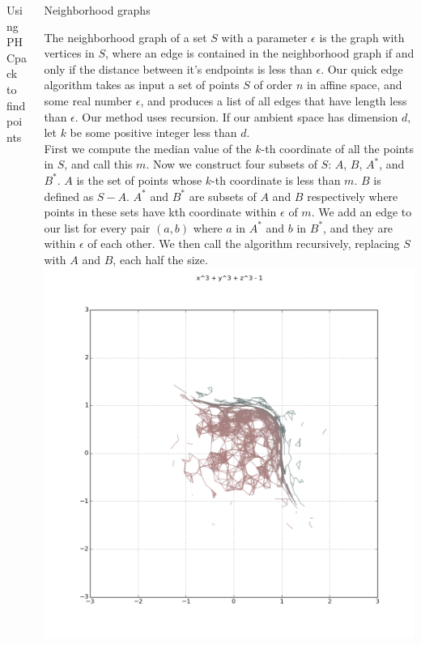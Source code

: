 \documentclass{beamer}
\begin{document}
\begin{frame}{}
\begin{columns}[t]
\begin{column}{0.32\linewidth}
\begin{block}{Using PHCpack to find points}

\end{block}

\end{column}%

\begin{column}{0.32\linewidth}

\begin{block}{Neighborhood graphs}

\justify
The neighborhood graph of a set $S$ with a parameter $\epsilon$ is the graph with vertices in $S$, where an edge is contained in the neighborhood graph if and only if the distance between it's endpoints is less than $\epsilon$. Our quick edge algorithm takes as input a set of points $S$ of order $n$ in affine space, and some real number $\epsilon$, and produces a list of all edges that have length less than $\epsilon$. Our method uses recursion. If our ambient space has dimension $d$, let $k$ be some positive integer less than $d$. 
\\

\justify
First we compute the median value of the $k$-th coordinate of all the points in $S$, and call this $m$. Now we construct four subsets of $S$: $A$, $B$, $A^*$, and $B^*$. $A$ is the set of points whose $k$-th coordinate is less than $m$. $B$ is defined as $S-A$. $A^*$ and $B^*$ are subsets of $A$ and $B$ respectively where points in these sets have kth coordinate within $\epsilon$ of $m$. We add an edge to our list for every pair $(a,b)$ where $a$ in $A^*$ and $b$ in $B^*$, and they are within $\epsilon$ of each other. We then call the algorithm recursively, replacing $S$ with $A$ and $B$, each half the size.
\\
\centering
\includegraphics[width=.8\columnwidth]{plot2d_ng_7}
\end{block}


\end{column}
\end{columns}
\end{frame}
\end{document}
